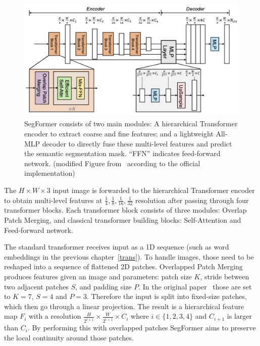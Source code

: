 \begin{figure}[h] %
    \centering
    \includegraphics[height=60mm]{figures/03_segformer_overview.png} %
    \caption{SegFormer consists of two main modules: A hierarchical Transformer encoder to extract coarse and fine features; and a lightweight All-MLP decoder to directly fuse these multi-level features and predict the semantic segmentation mask. “FFN” indicates feed-forward network. (modified Figure from~\cite{xie2021segformer} according to the official implementation)} %
    \label{fig:segformer_over} %
\end{figure} 

The $H\times W \times 3$ input image is forwarded to the hierarchical Transformer encoder to obtain multi-level features at $\frac{1}{4}, \frac{1}{8}, \frac{1}{16}, \frac{1}{32}$ resolution after passing through four transformer blocks.
Each transformer block consists of three modules: Overlap Patch Merging, and classical transformer building blocks: Self-Attention and Feed-forward network.

The standard transformer receives input as a 1D sequence (such as word embeddings in the previous chapter~\ref*{trans}).
To handle images, those need to be reshaped into a sequence of flattened 2D patches.
Overlapped Patch Merging produces features given an image and parameters: patch size $K$, stride between two adjacent patches $S$, and padding size $P$.
In the original paper~\cite{xie2021segformer} those are set to $K = 7$, $S = 4$ and $P = 3$.
Therefore the input is split into fixed-size patches, which then go through a linear projection.
The result is a hierarchical feature map $F_i$ with a
resolution $\frac{H}{2^{i+1}} \times \frac{W}{2^{i+1}} \times C_i$
where $i \in \{ 1,2,3,4\}$ and $C_{i+1}$ is larger than $C_i$.
By performing this with overlapped patches SegFormer aims to preserve the local continuity around those patches.

